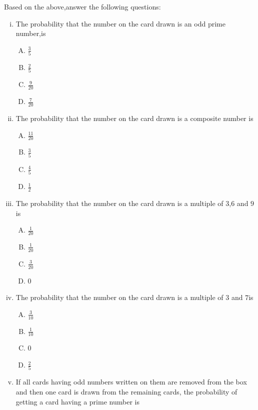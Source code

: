 \documentclass{article}
\begin{document}
\begin{enumerate}
Based on the above,answer the following questions:
\begin{enumerate}[(i)]
\item The probability that the number on the card drawn is an odd prime number,is
\begin{enumerate}[(A)]                            \item $\frac{3}{5}$                       \item $\frac{2}{5}$                       \item $\frac{9}{20}$                      \item $\frac{7}{20}$      
\end{enumerate}
\item The probability that the number on the card drawn is a composite number is
\begin{enumerate}[(A)]
	\item $\frac{11}{20}$                     \item $\frac{3}{5}$                       \item $\frac{4}{5}$                       \item $\frac{1}{2}$
\end{enumerate}
\item The probability that the number on the card drawn is a multiple of $3$,$6$ and $9$ is
\begin{enumerate}[(A)]                            \item $\frac{1}{20}$                      \item $\frac{1}{20}$                      \item $\frac{3}{20}$                      \item $0$               
\end{enumerate}
\item The probability that the number on the card drawn is a multiple of $3$ and $7$is
\begin{enumerate}[(A)]                            \item $\frac{3}{10}$                      \item $\frac{1}{10}$                      \item $0$
        \item $\frac{2}{5}$               \end{enumerate}
\item If all cards having odd numbers written on them are removed from the box and then one card is drawn from the remaining cards, the probability of getting a card having a prime number is

\end{enumerate}
\end{enumerate}
\end{document}
